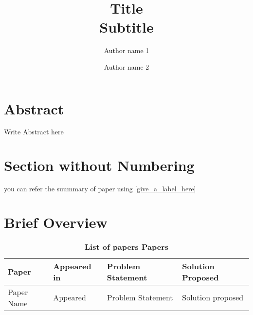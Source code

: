 \documentclass{R19}
\date{}
\begin{document}
\title{Title\\\small{Subtitle}}
\author{Author name 1 \and Author name 2}
\maketitle

\tableofcontents

\section{Abstract}
Write Abstract here

\section*{Section without Numbering}


you can refer  the suummary of paper using 
\ref{give_a_label_here}

\onecolumn
\section{Brief Overview}
\begin{table*}[h]
    \centerfloat
    \begin{tabular}{|m{10em}|m{7em}|m{14em}|m{17em}|  }
         \hline
         \textbf {Paper}& \textbf {Appeared in}& \textbf{Problem Statement} & \textbf{Solution Proposed}
         \\
         \hline
         Paper Name &
         Appeared &
         Problem Statement &
         Solution proposed\\
         \hline
    \end{tabular}
    \caption{\textbf{List of papers Papers}}
    \label{tab:index}
\end{table*}



\end{document}
